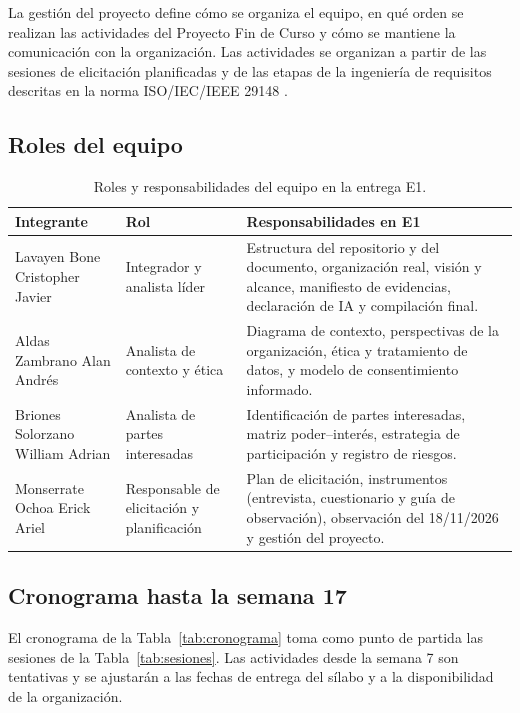 La gestión del proyecto define cómo se organiza el equipo, en qué orden se realizan las actividades del Proyecto Fin de Curso y cómo se mantiene la comunicación con la organización. Las actividades se organizan a partir de las sesiones de elicitación planificadas y de las etapas de la ingeniería de requisitos descritas en la norma ISO/IEC/IEEE 29148 \cite{iso29148}.

\subsection{Roles del equipo}

\begin{table}[H]
  \centering\small
  \caption{Roles y responsabilidades del equipo en la entrega E1.}\label{tab:roles}
  \renewcommand{\arraystretch}{1.3}
  \begin{tabularx}{\textwidth}{@{}>{\raggedright\arraybackslash}p{3.6cm}>{\raggedright\arraybackslash}p{3.0cm}L@{}}
    \toprule
    Integrante & Rol & Responsabilidades en E1 \\
    \midrule
    Lavayen Bone Cristopher Javier & Integrador y analista líder & Estructura del repositorio y del documento, organización real, visión y alcance, manifiesto de evidencias, declaración de IA y compilación final. \\
    Aldas Zambrano Alan Andrés & Analista de contexto y ética & Diagrama de contexto, perspectivas de la organización, ética y tratamiento de datos, y modelo de consentimiento informado. \\
    Briones Solorzano William Adrian & Analista de partes interesadas & Identificación de partes interesadas, matriz poder--interés, estrategia de participación y registro de riesgos. \\
    Monserrate Ochoa Erick Ariel & Responsable de elicitación y planificación & Plan de elicitación, instrumentos (entrevista, cuestionario y guía de observación), observación del 18/11/2026 y gestión del proyecto. \\
    \bottomrule
  \end{tabularx}
\end{table}

\subsection{Cronograma hasta la semana 17}

El cronograma de la Tabla~\ref{tab:cronograma} toma como punto de partida las sesiones de la Tabla~\ref{tab:sesiones}. Las actividades desde la semana 7 son tentativas y se ajustarán a las fechas de entrega del sílabo y a la disponibilidad de la organización.

